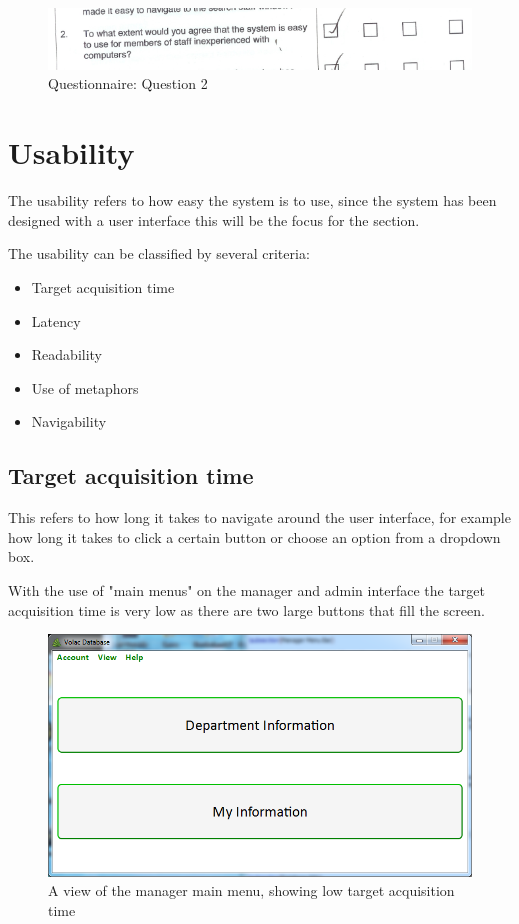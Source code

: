 \begin{figure}[H]
    \includegraphics[width=\textwidth]{./Evaluation/EvaluationQuestionnaire/2.png}
    \caption{Questionnaire: Question 2} 
\end{figure}
\section{Usability}

The usability refers to how easy the system is to use, since the system has been designed with a user interface this will be the focus for the section. 

The usability can be classified by several criteria:
\begin{itemize}
\item{Target acquisition time}
\item{Latency}
\item{Readability}
\item{Use of metaphors}
\item{Navigability}
\end{itemize}

\subsection{Target acquisition time}

This refers to how long it takes to navigate around the user interface, for example how long it takes to click a certain button or choose an option from a dropdown box.

With the use of "main menus" on the manager and admin interface the target acquisition time is very low as there are two large buttons that fill the screen.

\begin{figure}[H]
    \includegraphics[width=\textwidth]{./Maintenance/Images/ManagerMM.png}
    \caption{A view of the manager main menu, showing low target acquisition time} 
\end{figure}

